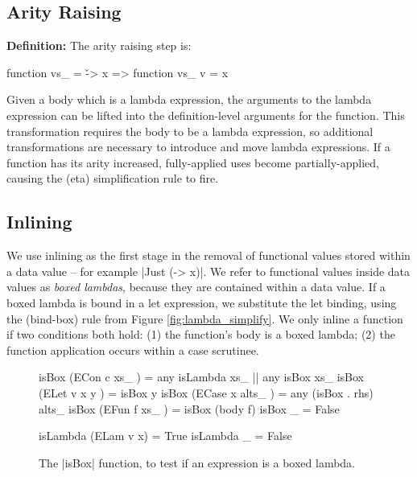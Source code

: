 \documentclass[preprint]{sigplanconf}
\newenvironment{definition}
    {\textbf{Definition:}}
    {\noexample}
\begin{document}
\subsection{Arity Raising}

\begin{definition}
The arity raising step is:

\ignore\begin{code}
function vs_ = \v -> x
    => function vs_ v = x
\end{code}
\end{definition}

Given a body which is a lambda expression, the arguments to the lambda expression can be lifted into the definition-level arguments for the function. This transformation requires the body to be a lambda expression, so additional transformations are necessary to introduce and move lambda expressions. If a function has its arity increased, fully-applied uses become partially-applied, causing the (eta) simplification rule to fire.


\subsection{Inlining}
\label{sec:inlining}

We use inlining as the first stage in the removal of functional values stored within a data value -- for example |Just (\x -> x)|. We refer to functional values inside data values as \textit{boxed lambdas}, because they are contained within a data value. If a boxed lambda is bound in a let expression, we substitute the let binding, using the (bind-box) rule from Figure \ref{fig:lambda_simplify}. We only inline a function if two conditions both hold: (1) the function's body is a boxed lambda; (2) the function application occurs within a case scrutinee.

\begin{figure}
\begin{code}
isBox (ECon c xs_     )  =  any isLambda xs_ ||  any isBox xs_
isBox (ELet v x y     )  =  isBox y
isBox (ECase x alts_  )  =  any (isBox . rhs) alts_
isBox (EFun f xs_     )  =  isBox (body f)
isBox _                  =  False

isLambda (ELam v x)  = True
isLambda _           = False
\end{code}
\caption{The |isBox| function, to test if an expression is a boxed lambda.}
\label{fig:boxed_lambda}
\end{figure}
\end{document}
